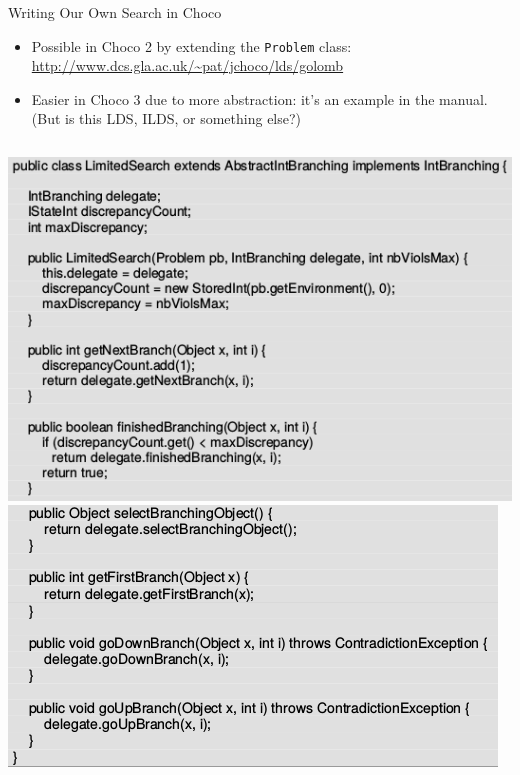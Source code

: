 \documentclass{beamer}
\begin{document}
\begin{frame}{Writing Our Own Search in Choco}
    \begin{itemize}
        \item Possible in Choco 2 by extending the \texttt{Problem} class: \\
            \url{http://www.dcs.gla.ac.uk/\~pat/jchoco/lds/golomb}
        \item Easier in Choco 3 due to more abstraction: it's an example in the manual. (But is this
            LDS, ILDS, or something else?)
    \end{itemize}

    \begin{columns}[T]
        \centering\includegraphics*[keepaspectratio=true,scale=0.3]{images/lds-choco3-col1.png}
        \centering\includegraphics*[keepaspectratio=true,scale=0.3]{images/lds-choco3-col2.png}
    \end{columns}
\end{frame}
\end{document}
